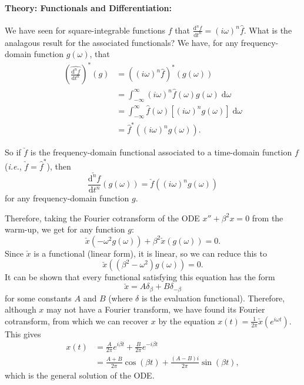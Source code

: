 \documentclass{article}
\newcommand{\deriv}[3][]{\frac{\mathrm{d}^{#1}#2}{\mathrm{d}#3^{#1}}}
\newcommand{\diff}{\;\mathrm{d}}
\begin{document}
\clearpage






\textbf{Theory: Functionals and Differentiation:}\bigskip



We have seen for square-integrable functions $f$ that $\widehat{\deriv[n]{f}{t}}=(i\omega)^n \hat{f}$. What is the analagous result for the associated functionals? We have, for any frequency-domain function $g(\omega)$, that
\begin{align*}
	\left(\widehat{\deriv[n]{f}{t}}\right)^*(g)&=\left((i\omega)^n\hat{f}\right)^*(g(\omega))\\
	&= \int_{-\infty}^\infty (i\omega)^n \hat{f}(\omega)g(\omega)\diff \omega\\
	&= \int_{-\infty}^\infty \hat{f}(\omega) \left[(i\omega)^n g(\omega)\right]\diff \omega\\
	&=\hat{f}^*\left((i\omega)^n g(\omega)\right).
\end{align*}

So if $\check{f}$ is the frequency-domain functional associated to a time-domain function $f$ (\textit{i.e.}, $\check{f}=\hat{f}^*$), then
\[\check{\deriv[n]{f}{t}}(g(\omega))=\check{f}((i\omega)^n g(\omega))\]
for any frequency-domain function $g$.


Therefore, taking the Fourier cotransform of the ODE $x''+\beta^2x=0$ from the warm-up, we get for any function $g$:
\[\check{x}\left(-\omega^2 g(\omega)\right)+\beta^2\check{x}(g(\omega))=0.\]
Since $\check{x}$ is a functional (linear form), it is linear, so we can reduce this to
\[\check{x}\left(\left(\beta^2-\omega^2\right)g(\omega)\right)=0.\]
It can be shown that every functional satisfying this equation has the form
\[\check{x}=A\delta_{\beta}+B\delta_{-\beta}\]
for some constants $A$ and $B$ (where $\delta$ is the evaluation functional). Therefore, although $x$ may not have a Fourier transform, we have found its Fourier cotransform, from which we can recover $x$ by the equation $x(t)=\frac{1}{2\pi}\check{x}\left(e^{i\omega t}\right)$. This gives
\begin{align*}
	x(t)&=\frac{A}{2\pi}e^{i\beta t}+\frac{B}{2\pi}e^{-i\beta t}\\
	&=\frac{A+B}{2\pi}\cos(\beta t)+\frac{(A-B)i}{2\pi}\sin(\beta t),
\end{align*}
which is the general solution of the ODE.



\clearpage
\end{document}
